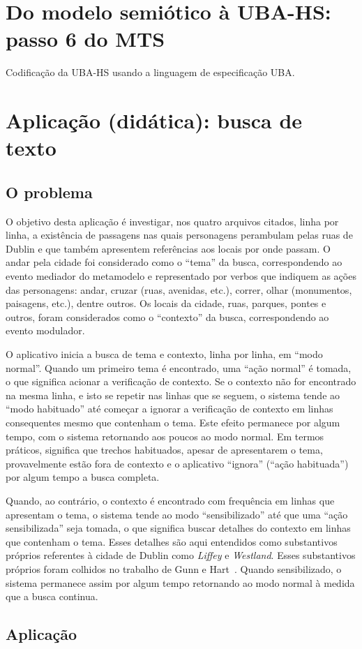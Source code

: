 
\section{Do modelo semiótico à UBA-HS: passo 6 do MTS}

Codificação da UBA-HS usando a linguagem de especificação UBA.

\section{Aplicação (didática): busca de texto}

\subsection{O problema}

O objetivo desta aplicação é investigar, nos quatro arquivos citados, linha por linha, a existência de passagens nas quais personagens perambulam pelas ruas de Dublin e que também apresentem referências aos locais por onde passam. O andar pela cidade foi considerado como o ``tema'' da busca, correspondendo ao evento mediador do metamodelo e representado por verbos que indiquem as ações das personagens: andar, cruzar (ruas, avenidas, etc.), correr, olhar (monumentos, paisagens, etc.), dentre outros. Os locais da cidade, ruas, parques, pontes e outros, foram  considerados como o ``contexto'' da busca, correspondendo ao evento modulador.

O aplicativo inicia a busca de tema e contexto, linha por linha, em ``modo normal''. Quando um primeiro tema é encontrado, uma ``ação normal'' é tomada, o que significa acionar a verificação de contexto. Se o contexto não for encontrado na mesma linha, e isto se repetir nas linhas que se seguem, o sistema tende ao  ``modo habituado'' até começar a ignorar a verificação de contexto em linhas consequentes mesmo que contenham o tema. Este efeito permanece por algum tempo, com o sistema retornando aos poucos ao modo normal. Em termos práticos, significa que trechos habituados, apesar de apresentarem o tema, provavelmente estão fora de contexto e o aplicativo ``ignora'' (``ação habituada'') por algum tempo a busca completa.

Quando, ao contrário, o contexto é encontrado com frequência em linhas que apresentam o tema, o sistema tende ao modo ``sensibilizado'' até que uma ``ação sensibilizada'' seja tomada, o que significa buscar detalhes do contexto em linhas que contenham o tema. Esses detalhes são aqui entendidos como substantivos próprios referentes à cidade de Dublin como \textit{Liffey} e \textit{Westland}. Esses substantivos próprios foram colhidos no trabalho de Gunn e Hart~\cite{gunn04}. Quando sensibilizado, o sistema permanece assim por algum tempo retornando ao modo normal à medida que a busca continua.

\subsection{Aplicação}
